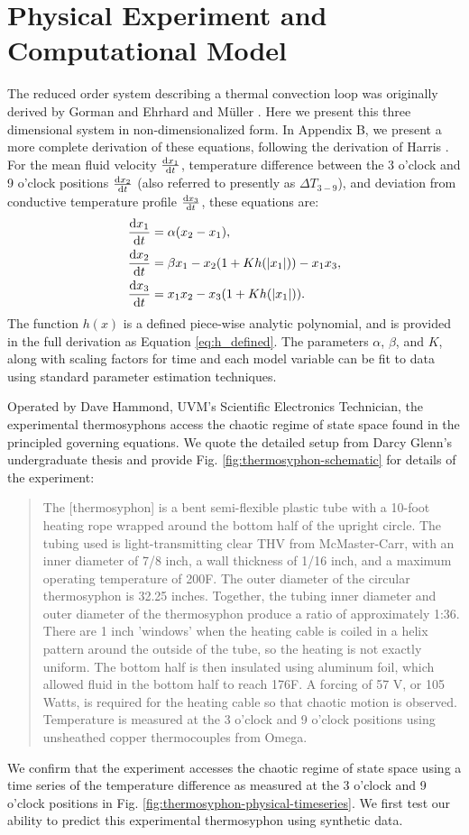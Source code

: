 \documentclass[pre,twocolumn,twoside,byrevtex,superscriptaddress]{revtex4}
\newcommand{\diff}[2]{\frac{{\rm d}#1}{{\rm d}#2}}
\begin{document}
\section*{Physical Experiment and Computational Model}

The reduced order system describing a thermal convection loop was originally derived by Gorman \cite{gorman1986} and Ehrhard and M\"{u}ller \cite{ehrhard1990dynamical}.
Here we present this three dimensional system in non-dimensionalized form.
In Appendix B, we present a more complete derivation of these equations, following the derivation of Harris \cite{harris2011predicting}.
For the mean fluid velocity $\diff{x_1}{t}$, temperature difference between the 3 o'clock and 9 o'clock positions $\diff{x_2}{t}$ (also referred to presently as $\Delta T_{3-9}$), and deviation from conductive temperature profile $\diff{x_3}{t}$, these equations are:
\begin{align}
& \diff{x_1}{t} = \alpha (x_2 - x_1),\\
& \diff{x_2}{t} = \beta x_1 - x_2 (1 + Kh(|x_1|)) - x_1x_3,\\
  & \diff{x_3}{t} = x_1x_2 - x_3 (1 + Kh(|x_1|)) .\end{align}
The function $h(x)$ is a defined piece-wise analytic polynomial, and is provided in the full derivation as Equation \ref{eq:h_defined}.
The parameters $\alpha$, $\beta$, and $K$, along with scaling factors for time and each model variable can be fit to data using standard parameter estimation techniques.

Operated by Dave Hammond, UVM's Scientific Electronics Technician, the experimental thermosyphons access the chaotic regime of state space found in the principled governing equations.
We quote the detailed setup from Darcy Glenn's undergraduate thesis \cite{glenn2013} and provide Fig. \ref{fig:thermosyphon-schematic} for details of the experiment:
\begin{quote}
The [thermosyphon] is a bent semi-flexible plastic tube with a 10-foot heating rope wrapped around the bottom half of the upright circle.
The tubing used is light-transmitting clear THV from McMaster-Carr, with an inner diameter of 7/8 inch, a wall thickness of 1/16 inch, and a maximum operating temperature of 200F.
The outer diameter of the circular thermosyphon is 32.25 inches.
Together, the tubing inner diameter and outer diameter of the thermosyphon produce a ratio of approximately 1:36.
There are 1 inch 'windows' when the heating cable is coiled in a helix pattern around the outside of the tube, so the heating is not exactly uniform.
The bottom half is then insulated using aluminum foil, which allowed fluid in the bottom half to reach 176F.
A forcing of 57 V, or 105 Watts, is required for the heating cable so that chaotic motion is observed.
Temperature is measured at the 3 o'clock and 9 o'clock positions using unsheathed copper thermocouples from Omega.
\end{quote}
We confirm that the experiment accesses the chaotic regime of state space using a time series of the temperature difference as measured at the 3 o'clock and 9 o'clock positions in Fig. \ref{fig:thermosyphon-physical-timeseries}.
We first test our ability to predict this experimental thermosyphon using synthetic data.
\end{document}
